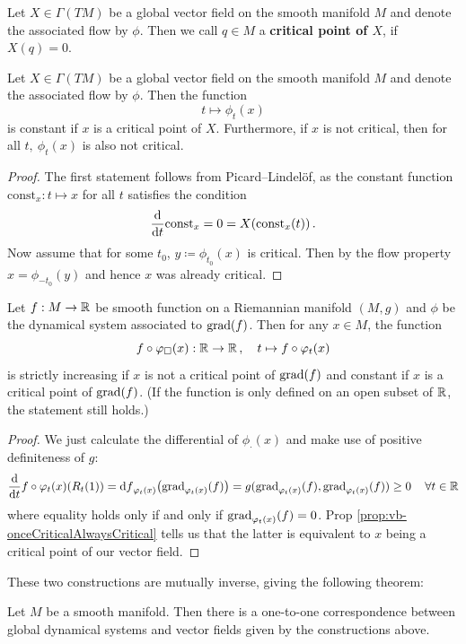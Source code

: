 \begin{definition}
	Let $X\in \Gamma(TM)$ be a global vector field on the smooth manifold $M$ and denote the associated flow by $\phi$. Then we call $q\in M$ a \textbf{critical point of $X$}, if $X(q)=0$.
\end{definition}
\begin{proposition}\label{prop:vb-onceCriticalAlwaysCritical}
	Let $X\in \Gamma(TM)$ be a global vector field on the smooth manifold $M$ and denote the associated flow by $\phi$. Then the function 
	\begin{equation*}
		t\mapsto \phi_t(x)
	\end{equation*} is constant if $x$ is a critical point of $X$. Furthermore, if $x$ is not critical, then for all $t,~ \phi_t(x)$ is also not critical.
\end{proposition}
\begin{proof}
	The first statement follows from Picard–Lindelöf, as the constant function $\mathrm{const}_x: t\mapsto x$ for all $t$ satisfies the condition 
	\begin{equation*}
		\frac{\mathop{}\!\mathrm{d}}{\mathop{}\!\mathrm{d} t}\mathrm{const}_x=0=X(\mathrm{const}_x(t))\,.
	\end{equation*}
	Now assume that for some $t_0$, $y\coloneq \phi_{t_0}(x)$ is critical. Then by the flow property $x=\phi_{-t_0}(y)$ and hence $x$ was already critical.
\end{proof}

\begin{proposition} \label{prop:vb-ffDecreasesAlongGradientFlow}
	Let $f:M\to \mathbb{R}$ be smooth function on a Riemannian manifold $(M,g)$ and  $\phi$ be the dynamical system associated to $\mathrm{grad}(f)$. Then for any $x\in M$, the function
	\begin{equation*}
		f\circ \varphi_{\square}(x):\mathbb{R}\to \mathbb{R}\,,\quad t\mapsto f\circ \varphi_t(x)
	\end{equation*} is strictly increasing if $x$ is not a critical point of $\mathrm{grad}(f)$ and constant if $x$ is a critical point of $\mathrm{grad}(f)$. (If the function is only defined on an open subset of $\mathbb{R}$, the statement still holds.)
\end{proposition}

\begin{proof}
	We just calculate the differential of $\phi_{\cdot}(x)$ and make use of positive definiteness of $g$:
	\begin{equation*}
		\frac{\mathop{}\!\mathrm{d}}{\mathop{}\!\mathrm{d} t}f\circ \varphi_{t}(x)(R_t(1))={\mathop{}\!\mathrm{d} f}_{\varphi_t(x)} \big( \mathrm{grad}_{\varphi_t(x)}(f)\big)=g(\mathrm{grad}_{\varphi_t(x)}(f),\mathrm{grad}_{\varphi_t(x)}(f))\geq 0\, \quad \forall t\in \mathbb{R}
	\end{equation*} where equality holds only if and only if $\mathrm{grad}_{\varphi_t(x)}(f)=0$. Prop \ref{prop:vb-onceCriticalAlwaysCritical} tells us that the latter is equivalent to $x$ being a critical point of our vector field.
\end{proof}

These two constructions are mutually inverse, giving the following theorem:
\begin{theorem}
	Let $M$ be a smooth manifold. Then there is a one-to-one correspondence between global dynamical systems and vector fields given by the constructions above.
\end{theorem}

